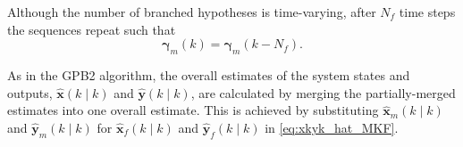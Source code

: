 {%
Although the number of branched hypotheses is time-varying, after $N_f$ time steps the sequences repeat such that
%
\begin{equation} \label{eq:rmkrmkmNf_SFex2}
	\mathbf{\gamma}_m(k) = \mathbf{\gamma}_m(k-N_f).
\end{equation}

As in the \gls{GPB2} algorithm, the overall estimates of the system states and outputs, $\hat{\mathbf{x}}(k \mid k)$ and $\hat{\mathbf{y}}(k \mid k)$, are calculated by merging the partially-merged estimates into one overall estimate. This is achieved by substituting $\mathbf{\hat{x}}_m(k \mid k)$ and $\mathbf{\hat{y}}_m(k \mid k)$ for $\mathbf{\hat{x}}_f(k \mid k)$ and $\mathbf{\hat{y}}_f(k \mid k)$ in \eqref{eq:xkyk_hat_MKF}.

}
